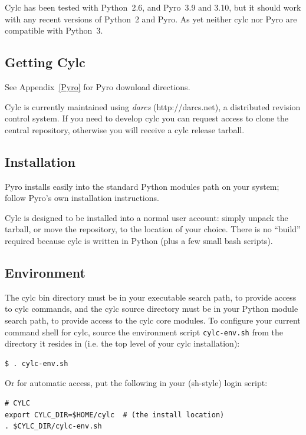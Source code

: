 \documentclass[11pt,a4paper]{article}
\begin{document}
Cylc has been tested with Python~2.6, and Pyro~3.9 and 3.10,
but it should work with any recent versions of Python~2 and Pyro.
As yet neither cylc nor Pyro are compatible with Python~3. 

\subsection{Getting Cylc} 
\label{GettingCylc}

See Appendix~\ref{Pyro} for Pyro download directions.

Cylc is currently maintained using {\em darcs} (http://darcs.net), a
distributed revision control system. If you need to develop cylc you can
request access to clone the central repository, otherwise you will
receive a cylc release tarball. 

\subsection{Installation} 
\label{Installation}

Pyro installs easily into the standard Python modules path on your
system; follow Pyro's own installation instructions.

Cylc is designed to be installed into a normal user account: simply
unpack the tarball, or move the repository, to the location of your
choice. There is no ``build'' required because cylc is written in Python
(plus a few small bash scripts).

\subsection{Environment} 
\label{Environment}

\lstset{language=bash} 

The cylc bin directory must be in your executable search path, to
provide access to cylc commands, and the cylc source directory must be
in your Python module search path, to provide access to the cylc core
modules. To configure your current command shell for cylc, source 
the environment script \lstinline=cylc-env.sh= from the directory it
resides in (i.e. the top level of your cylc installation):

\begin{lstlisting}
$ . cylc-env.sh
\end{lstlisting}

Or for automatic access, put the following in your (sh-style) login
script:

\begin{lstlisting}
# CYLC
export CYLC_DIR=$HOME/cylc  # (the install location)
. $CYLC_DIR/cylc-env.sh
\end{lstlisting}
\end{document}
